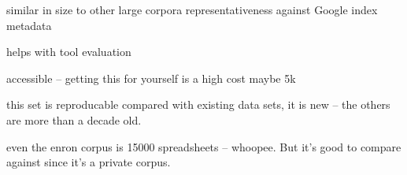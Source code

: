 \documentclass[conference]{IEEEtran}
\begin{document}


similar in size to other large corpora
representativeness against Google index
metadata

helps with tool evaluation

accessible -- getting this for yourself is a high cost maybe 5k

this set is reproducable
compared with existing data sets, it is new -- the others are more than a decade old.

even the enron corpus is 15000 spreadsheets -- whoopee. But it's good to compare against since it's a private corpus.
\end{document}
